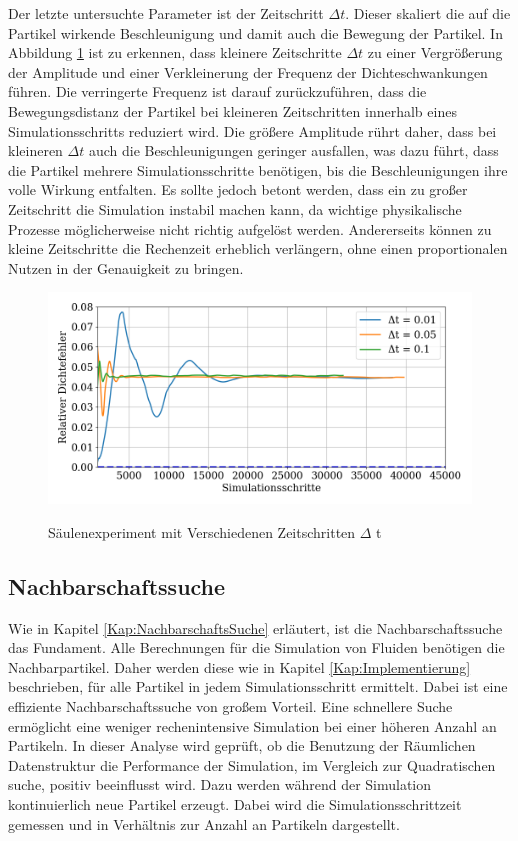 \documentclass[a4paper, 12pt]{article}
\begin{document}
Der letzte untersuchte Parameter ist der Zeitschritt \(\Delta t\). Dieser skaliert die auf die Partikel wirkende Beschleunigung und damit auch die Bewegung der Partikel. In Abbildung \ref{Säulenexperiment_t} ist zu erkennen, dass kleinere Zeitschritte \(\Delta t\) zu einer Vergrößerung der Amplitude und einer Verkleinerung der Frequenz der Dichteschwankungen führen. Die verringerte Frequenz ist darauf zurückzuführen, dass die Bewegungsdistanz der Partikel bei kleineren Zeitschritten innerhalb eines Simulationsschritts reduziert wird. Die größere Amplitude rührt daher, dass bei kleineren \(\Delta t\) auch die Beschleunigungen geringer ausfallen, was dazu führt, dass die Partikel mehrere Simulationsschritte benötigen, bis die Beschleunigungen ihre volle Wirkung entfalten. Es sollte jedoch betont werden, dass ein zu großer Zeitschritt die Simulation instabil machen kann, da wichtige physikalische Prozesse möglicherweise nicht richtig aufgelöst werden. Andererseits können zu kleine Zeitschritte die Rechenzeit erheblich verlängern, ohne einen proportionalen Nutzen in der Genauigkeit zu bringen.

\begin{figure}[H]
	\centering
	\includegraphics[width=.85\textwidth]{graphics/Zeitschritt.png}	
	\label{Säulenexperiment_t}
	\caption{Säulenexperiment mit Verschiedenen Zeitschritten $\Delta$ t}
\end{figure}

\subsection{Nachbarschaftssuche}
Wie in Kapitel \ref{Kap:NachbarschaftsSuche} erläutert, ist die Nachbarschaftssuche das Fundament. Alle Berechnungen für die Simulation von Fluiden benötigen die Nachbarpartikel. Daher werden diese wie in Kapitel \ref{Kap:Implementierung} beschrieben, für alle Partikel in jedem Simulationsschritt ermittelt. Dabei ist eine effiziente Nachbarschaftssuche von großem Vorteil. Eine schnellere Suche ermöglicht eine weniger rechenintensive Simulation bei einer höheren Anzahl an Partikeln. In dieser Analyse wird geprüft, ob die Benutzung der Räumlichen Datenstruktur die Performance der Simulation, im Vergleich zur Quadratischen suche, positiv beeinflusst wird. Dazu werden während der Simulation kontinuierlich neue Partikel erzeugt. Dabei wird die Simulationsschrittzeit gemessen und in Verhältnis zur Anzahl an Partikeln dargestellt.
\end{document}
